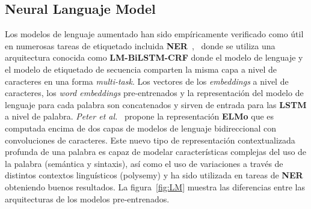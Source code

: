 \subsection{Neural Languaje Model}

%
%
%
%
%

Los modelos de lenguaje aumentado han sido emp\'iricamente verificado como \'util en numerosas tareas de etiquetado incluida \textbf{NER}~\cite{liu2018efficient},~\cite{liu2018empower} donde se utiliza una arquitectura conocida como \textbf{LM-BiLSTM-CRF} donde el modelo de lenguaje y el modelo de etiquetado de secuencia comparten la misma capa a nivel de caracteres en una forma \emph{multi-task}. Los vectores de los \emph{embeddings} a nivel de caracteres, los \emph{word embeddings} pre-entrenados y la representaci\'on del modelo de lenguaje para cada palabra son concatenados y sirven de entrada para las \textbf{LSTM} a nivel de palabra. \emph{Peter et al.}~\cite{peters2018deep} propone la representaci\'on \textbf{ELMo} que es computada encima de dos capas de modelos de lenguaje bidireccional con convoluciones de caracteres. Este nuevo tipo de representaci\'on contextualizada profunda de una palabra es capaz de modelar caracter\'isticas complejas del uso de la palabra (sem\'antica y sintaxis), as\'i como el uso de variaciones a trav\'es de distintos contextos lingu\'isticos (polysemy) y ha sido utilizada en tareas de \textbf{NER} obteniendo buenos resultados. La figura~\ref{fig:LM} muestra las diferencias entre las arquitecturas de los modelos pre-entrenados.

